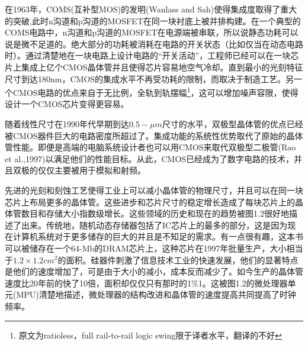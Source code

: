 \documentclass[cn,11pt,chinese]{elegantbook}
\begin{document}
在1963年，COMS(互补型MOS)的发明(Wanlass and Sah)使得集成度取得了重大的突破,此时n沟道和p沟道的MOSFET在同一块衬底上被并排构建。在一个典型的COMS电路中，n沟道和p沟道的MOSFET在电源端被串联，所以说静态功耗可以说是微不足道的。绝大部分的功耗被消耗在电路的开关状态（比如仅当在动态电路时）。通过清楚地在一块电路上设计电路的“开关活动”，工程师已经可以在一块芯片上集成上亿个CMOS晶体管并且使得芯片容易地空气冷却。直到最小的光刻特征尺寸到达180nm，CMOS的集成水平不再受功耗的限制，而取决于制造工艺。另一个CMOS电路的优点来自于无比例，全轨到轨摆幅\footnote{原文为ratioless，full rail-to-rail logic swing限于译者水平，翻译的不好}，这可以增加噪声容限，使得设计一个CMOS芯片变得更容易。


随着线性尺寸在1990年代早期到达$0.5-\mu m$尺寸的水平，双极型晶体管的优点已经被CMOS器件巨大的电路密度所超过了。集成功能的系统性优势取代了原始的晶体管性能。即便是高端的电脑系统设计者也可以用CMOS来取代双极型二极管(Rao et al.,1997)以满足他们的性能目标。从此，CMOS已经成为了数字电路的技术，并且双极的仅仅主要被用于模拟和射频。

先进的光刻和刻蚀工艺使得工业上可以减小晶体管的物理尺寸，并且可以在同一块芯片上布局更多的晶体管。这些进步和芯片尺寸的稳定增长造成了每块芯片上的晶体管数目和存储大小指数级增长。这些领域的历史和现在的趋势被图1.2很好地描述了出来。传统地，随机动态存储器包括了IC芯片上的最多的部分，这是因为现在计算机系统对于更多储存的巨大的并且是不知足的需求。有一点很有趣，这本书可以被储存在一个64-Mb的DRAM芯片上，这种芯片在1997年批量生产，大小相当于$1.2\times 1.2cm^2$的面积。硅器件刺激了信息技术工业的快速发展，他们的显著特点是他们的速度增加了，可是由于大小的减小，成本反而减少了。如今生产的晶体管速度比20年前的快了10倍，面积却仅仅只有那时的1\%1。这被图1.2的微处理器单元(MPU)清楚地描述，微处理器的结构改进和晶体管的速度提高共同提高了时钟频率。
\end{document}
